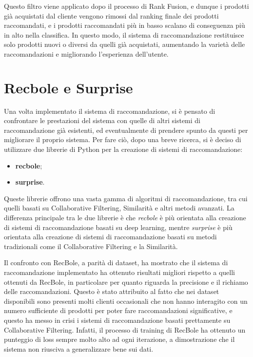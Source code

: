 Questo filtro viene applicato dopo il processo di Rank Fusion, e dunque i prodotti già acquistati dal cliente vengono rimossi dal ranking finale dei prodotti raccomandati, e i prodotti raccomandati più in basso scalano di conseguenza più in alto nella classifica. In questo modo, il sistema di raccomandazione restituisce solo prodotti nuovi o diversi da quelli già acquistati, aumentando la varietà delle raccomandazioni e migliorando l'esperienza dell'utente.


\section{Recbole e Surprise}

Una volta implementato il sistema di raccomandazione, si è pensato di confrontare le prestazioni del sistema con quelle di altri sistemi di raccomandazione già esistenti, ed eventualmente di prendere spunto da questi per migliorare il proprio sistema.
Per fare ciò, dopo una breve ricerca, si è deciso di utilizzare due librerie di Python per la creazione di sistemi di raccomandazione:
\begin{itemize}
    \item \textbf{\gls{recbole}};
    \item \textbf{\gls{surprise}}.
\end{itemize}

Queste librerie offrono una vasta gamma di algoritmi di raccomandazione, tra cui quelli basati su Collaborative Filtering, Similarità e altri metodi avanzati. La differenza principale tra le due librerie è che \emph{recbole} è più orientata alla creazione di sistemi di raccomandazione basati su deep learning, mentre \emph{surprise} è più orientata alla creazione di sistemi di raccomandazione basati su metodi tradizionali come il Collaborative Filtering e la Similarità.

Il confronto con RecBole, a parità di dataset, ha mostrato che il sistema di raccomandazione implementato ha ottenuto risultati migliori rispetto a quelli ottenuti da RecBole, in particolare per quanto riguarda la precisione e il richiamo delle raccomandazioni. Questo è stato attribuito al fatto che nei dataset disponibili sono presenti molti clienti occasionali che non hanno interagito con un numero sufficiente di prodotti per poter fare raccomandazioni significative, e questo ha messo in crisi i sistemi di raccomandazione basati prettamente su Collaborative Filtering. Infatti, il processo di training di RecBole ha ottenuto un punteggio di loss sempre molto alto ad ogni iterazione, a dimostrazione che il sistema non riusciva a generalizzare bene sui dati.


